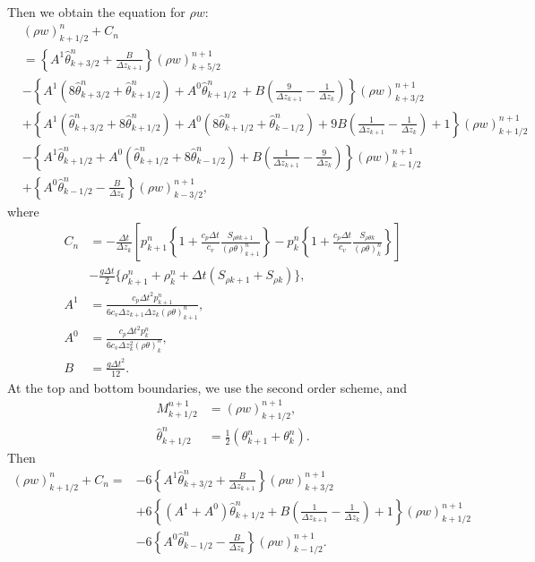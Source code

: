 Then we obtain the equation for $\rho w$:
\begin{align}
  & (\rho w)_{k+1/2}^n + C_n \\
  &= \left\{A^1\hat\theta_{k+3/2}^n + \frac{B}{\Delta z_{k+1}}\right\} (\rho w)_{k+5/2}^{n+1} \nonumber \\
  &- \left\{A^1(8\hat\theta_{k+3/2}^n+\hat\theta_{k+1/2}^n) + A^0\hat\theta_{k+1/2}^n\ + B\left(\frac{9}{\Delta z_{k+1}}-\frac{1}{\Delta z_k}\right)\right\} (\rho w)_{k+3/2}^{n+1} \nonumber \\
  &+ \left\{A^1(\hat\theta_{k+3/2}^n+8\hat\theta_{k+1/2}^n) + A^0(8\hat\theta_{k+1/2}^n+\hat\theta_{k-1/2}^n) + 9B\left(\frac{1}{\Delta z_{k+1}}-\frac{1}{\Delta z_k}\right) + 1\right\} (\rho w)_{k+1/2}^{n+1} \nonumber \\
  &- \left\{A^1\hat\theta_{k+1/2}^n + A^0(\hat\theta_{k+1/2}^n+8\hat\theta_{k-1/2}^n) + B\left(\frac{1}{\Delta z_{k+1}}-\frac{9}{\Delta z_k}\right)\right\} (\rho w)_{k-1/2}^{n+1} \nonumber \\
  &+ \left\{A^0\hat\theta_{k-1/2}^n - \frac{B}{\Delta z_k}\right\} (\rho w)_{k-3/2}^{n+1},
\end{align}
where
\begin{align}
  C_n
  &= -\frac{\Delta t}{\Delta z_k}\left[
    p_{k+1}^n\left\{1+\frac{c_p\Delta t}{c_v}\frac{S_{\rho\theta k+1}}{(\rho\theta)_{k+1}^n}\right\}
  - p_k^n   \left\{1+\frac{c_p\Delta t}{c_v}\frac{S_{\rho\theta k}  }{(\rho\theta)_k^n   }\right\}
    \right] \nonumber \\
  &-\frac{g\Delta t}{2}\{\rho_{k+1}^n+\rho_k^n+\Delta t(S_{\rho k+1}+S_{\rho k})\}, \\
  A^1 &= \frac{c_p\Delta t^2 p_{k+1}^n}{6c_v\Delta z_{k+1}\Delta z_k(\rho\theta)_{k+1}^n}, \\
  A^0 &= \frac{c_p\Delta t^2 p_k^n   }{6c_v\Delta z_k^2           (\rho\theta)_k^n}, \\
  B &= \frac{g\Delta t^2}{12}.
\end{align}
At the top and bottom boundaries,
we use the second order scheme,
and
\begin{align}
  M_{k+1/2}^{n+1} &= (\rho w)_{k+1/2}^{n+1}, \\
  \hat\theta_{k+1/2}^n &= \frac{1}{2}(\theta_{k+1}^n+\theta_k^n).
\end{align}
Then
\begin{align}
  (\rho w)_{k+1/2}^n + C_n =
  &- 6\left\{A^1\hat\theta_{k+3/2}^n + \frac{B}{\Delta z_{k+1}}\right\} (\rho w)_{k+3/2}^{n+1} \nonumber \\
  &+ 6\left\{(A^1+A^0)\hat\theta_{k+1/2}^n + B\left(\frac{1}{\Delta z_{k+1}}-\frac{1}{\Delta z_k}\right) + 1\right\} (\rho w)_{k+1/2}^{n+1} \nonumber \\
  &- 6\left\{A^0\hat\theta_{k-1/2}^n - \frac{B}{\Delta z_k}\right\} (\rho w)_{k-1/2}^{n+1}.
\end{align}


